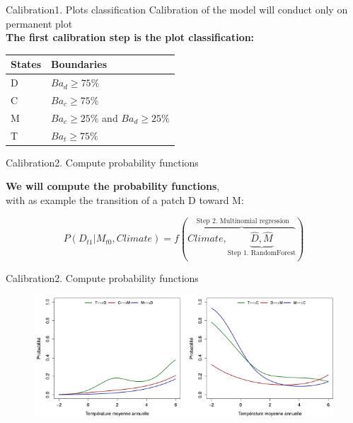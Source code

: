 \documentclass[table]{eecslides}
\begin{document}
\begin{frame}{Calibration}{1. Plots classification}
Calibration of the model will conduct only on permanent plot\\
\vspace{1em}
\textbf{The first calibration step is the plot classification:}
\vspace{1em}

\begin{table}
\begin{tabular}{|l|l|}
	\hline
	\textbf{States}  & \textbf{Boundaries}\\
	\hline
	D & $Ba_d \geq 75\%$    \\
	C & $Ba_c \geq 75\%$   \\
	M & $Ba_c \geq 25\%$ and $Ba_d \geq 25\%$ \\
	T & $Ba_t  \geq 75\%$ \\
	\hline
\end{tabular}
\end{table}

\end{frame}


\begin{frame}{Calibration}{2. Compute probability functions}

\textbf{We will compute the probability functions},\\
with as example the transition of a patch D toward M:
\vspace{1em}

\begin{equation}
	P(D_{t1}|M_{t0}, Climate) = f(\overbrace{Climate, \underbrace{\hat{D}, \hat{M}}_\text{Step 1. RandomForest}}^\text{ Step 2. Multinomial regression})
\label{eq1}
\end{equation}
\end{frame}


\begin{frame}{Calibration}{2. Compute probability functions}

\begin{figure}
	\includegraphics[width=.80\paperwidth]{Figs/Gravel_Bic.pdf}
\end{figure}

\end{frame}
\end{document}
